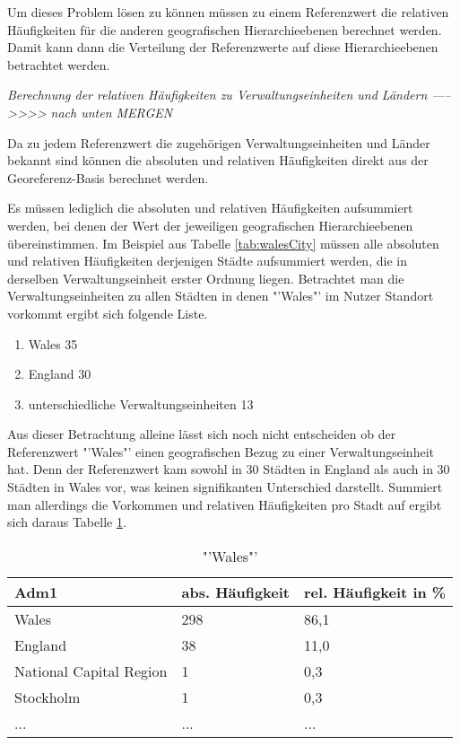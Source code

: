 			Um dieses Problem lösen zu können müssen zu einem Referenzwert die relativen Häufigkeiten für die anderen geografischen Hierarchieebenen berechnet werden.
			Damit kann dann die Verteilung der Referenzwerte auf diese Hierarchieebenen betrachtet werden.
			
		\textit{Berechnung der relativen Häufigkeiten zu Verwaltungseinheiten und Ländern ----->>>> nach unten MERGEN } 

			Da zu jedem Referenzwert die zugehörigen Verwaltungseinheiten und Länder bekannt sind können die absoluten und relativen Häufigkeiten direkt aus der Georeferenz-Basis berechnet werden.

			Es müssen lediglich die absoluten und relativen Häufigkeiten aufsummiert werden, bei denen der Wert der jeweiligen geografischen Hierarchieebenen übereinstimmen.
			Im Beispiel aus Tabelle \ref{tab:walesCity} müssen alle absoluten und relativen Häufigkeiten derjenigen Städte aufsummiert werden, die in derselben Verwaltungseinheit erster Ordnung liegen.
			Betrachtet man die Verwaltungseinheiten zu allen Städten in denen "'Wales"' im Nutzer Standort vorkommt ergibt sich folgende Liste.

			\begin{enumerate}
				\item Wales 35
				\item England 30
				\item unterschiedliche Verwaltungseinheiten 13
			\end{enumerate}

			Aus dieser Betrachtung alleine lässt sich noch nicht entscheiden ob der Referenzwert "'Wales"' einen geografischen Bezug zu einer Verwaltungseinheit hat.
			Denn der Referenzwert kam sowohl in 30 Städten in England als auch in 30 Städten in Wales vor, was keinen signifikanten Unterschied darstellt. 
			Summiert man allerdings die Vorkommen und relativen Häufigkeiten pro Stadt auf ergibt sich daraus Tabelle \ref{tab:WalesVerw1}.

			\begin{table}[h]
			\centering
			\caption{"'Wales"'}
			\label{tab:WalesVerw1}
			\begin{tabular}{|l|l|l|}
			\hline
			Adm1 & abs. Häufigkeit & rel. Häufigkeit in \% \\ \hline \hline
			Wales                   & 298 & 86,1 \\ \hline
			England                 & 38  & 11,0 \\ \hline
			National Capital Region & 1   & 0,3  \\ \hline
			Stockholm               & 1   & 0,3  \\ \hline
			... & ... & ... \\ \hline
			\end{tabular}
			\end{table}  

